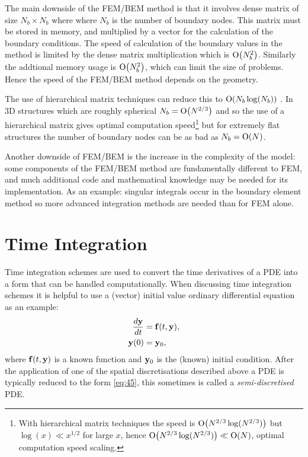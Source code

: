 The main downside of the FEM/BEM method is that it involves dense matrix of size $N_b \times N_b$ where where $N_b$ is the number of boundary nodes.
This matrix must be stored in memory, and multiplied by a vector for the calculation of the boundary conditions.
The speed of calculation of the boundary values in the method is limited by the dense matrix multiplication which is $\text{O}{\left( N_b^2 \right)}$.
Similarly the addtional memory usage is $\text{O}{\left( N_b^2 \right)}$, which can limit the size of problems.
Hence the speed of the FEM/BEM method depends on the geometry.

The use of hierarchical matrix techniques can reduce this to $\text{O}{\left( N_b \log(N_b) \right)}$ \cite{Knittel2009}.
In 3D structures which are roughly spherical $N_b = \text{O}{\left( N^{2/3} \right)}$ and so the use of a hierarchical matrix gives optimal computation speed\footnote{With hierarchical matrix techniques the speed is $\text{O}{\left( N^{2/3}\log(N^{2/3}) \right)}$ but $\log(x) \ll x^{1/2}$ for large $x$, hence $\text{O}{\left( N^{2/3}\log(N^{2/3}) \right)} \ll \text{O}{\left( N \right)}$, \ie optimal computation speed scaling.} but for extremely flat structures the number of boundary nodes can be as bad as $N_b = \text{O}{\left( N \right)}$.

Another downside of FEM/BEM is the increase in the complexity of the model: some components of the FEM/BEM method are fundamentally different to FEM, and much additional code and mathematical knowledge may be needed for its implementation.
As an example: singular integrals occur in the boundary element method so more advanced integration methods are needed than for FEM alone.


\section{Time Integration}
\label{sec:time-discretisation}

Time integration schemes are used to convert the time derivatives of a PDE into a form that can be handled computationally. 
When discussing time integration schemes it is helpful to use a (vector) initial value ordinary differential equation as an example:
\begin{equation}
  \begin{aligned}
    \frac{d \mathbf{y}}{dt} &= {\mathbf{f}{\left( t, \mathbf{y} \right)}}, \\
    \mathbf{y}(0) &= \mathbf{y}_0,
    \label{eq:45}
  \end{aligned}
\end{equation}
where ${\mathbf{f}}(t,\mathbf{y})$ is a known function and $\mathbf{y}_0$ is the (known) initial condition.
After the application of one of the spatial discretisations described above a PDE is typically reduced to the form \cref{eq:45}, this sometimes is called a \emph{semi-discretised} PDE.

